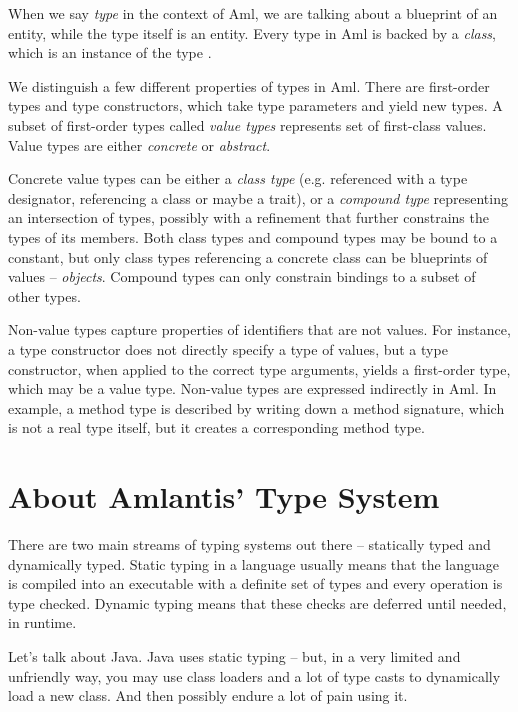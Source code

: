 When we say \textit{type} in the context of Aml, we are talking about a blueprint of an entity, while the type itself is an entity. Every type in Aml is backed by a \textit{class}, which is an instance of the type \lstinline@Class@. 

We distinguish a few different properties of types in Aml. There are first-order types and type constructors, which take type parameters and yield new types. A subset of first-order types called \textit{value types} represents set of first-class values. Value types are either \textit{concrete} or \textit{abstract}. 

Concrete value types can be either a \textit{class type} (e.g. referenced with a type designator, referencing a class or maybe a trait), or a \textit{compound type} representing an intersection of types, possibly with a refinement that further constrains the types of its members. Both class types and compound types may be bound to a constant, but only class types referencing a concrete class can be blueprints of values -- \textit{objects}. Compound types can only constrain bindings to a subset of other types. 

Non-value types capture properties of identifiers that are not values. For instance, a type constructor does not directly specify a type of values, but a type constructor, when applied to the correct type arguments, yields a first-order type, which may be a value type. Non-value types are expressed indirectly in Aml. In example, a method type is described by writing down a method signature, which is not a real type itself, but it creates a corresponding method type. 






\section{About Amlantis' Type System}

There are two main streams of typing systems out there -- statically typed and dynamically typed. Static typing in a language usually means that the language is compiled into an executable with a definite set of types and every operation is type checked. Dynamic typing means that these checks are deferred until needed, in runtime. 

Let's talk about Java. Java uses static typing -- but, in a very limited and unfriendly way, you may use class loaders and a lot of type casts to dynamically load a new class. And then possibly endure a lot of pain using it. 


